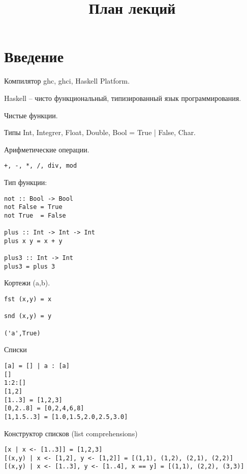 \documentclass[a4paper,10pt]{article}
\begin{document}
\lstset{language=Haskell} 
\setcounter{secnumdepth}{0}
\title{План лекций}
\date{}
\maketitle

\section{Введение}
Компилятор ghc, ghci, Haskell Platform.

Haskell – чисто функциональный, типизированный язык программирования.

Чистые функции.

Типы Int, Integrer, Float, Double, Bool = True | False, Char.

Арифметические операции.
\begin{lstlisting}
+, -, *, /, div, mod
\end{lstlisting}

Тип функции:
\begin{lstlisting}
not :: Bool -> Bool
not False = True
not True  = False

plus :: Int -> Int -> Int
plus x y = x + y

plus3 :: Int -> Int
plus3 = plus 3
\end{lstlisting}

Кортежи (a,b).
\begin{lstlisting}
fst (x,y) = x

snd (x,y) = y

('a',True)
\end{lstlisting}

Списки
\begin{lstlisting}
[a] = [] | a : [a]
[]
1:2:[]
[1,2]
[1..3] = [1,2,3]
[0,2..8] = [0,2,4,6,8]
[1,1.5..3] = [1.0,1.5,2.0,2.5,3.0]
\end{lstlisting}

Конструктор списков (list comprehensions)
\begin{lstlisting}
[x | x <- [1..3]] = [1,2,3]
[(x,y) | x <- [1,2], y <- [1,2]] = [(1,1), (1,2), (2,1), (2,2)]
[(x,y) | x <- [1..3], y <- [1..4], x == y] = [(1,1), (2,2), (3,3)]
\end{lstlisting}
\end{document}
